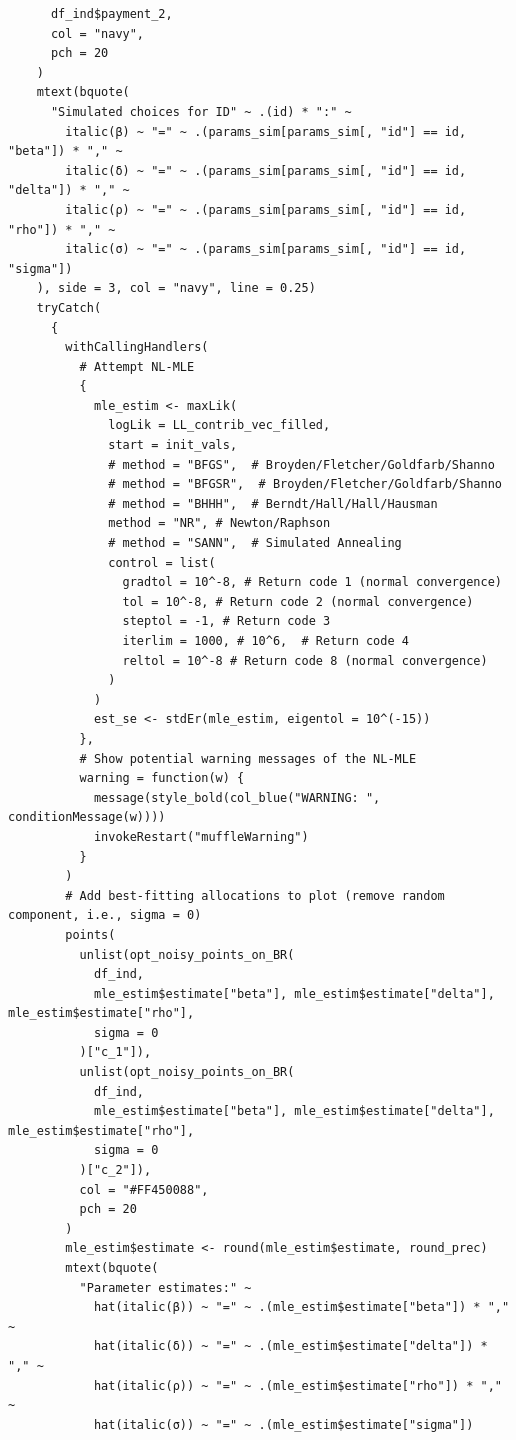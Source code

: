 \begin{lstlisting}
      df_ind$payment_2,
      col = "navy",
      pch = 20
    )
    mtext(bquote(
      "Simulated choices for ID" ~ .(id) * ":" ~
        italic(β) ~ "=" ~ .(params_sim[params_sim[, "id"] == id, "beta"]) * "," ~
        italic(δ) ~ "=" ~ .(params_sim[params_sim[, "id"] == id, "delta"]) * "," ~
        italic(ρ) ~ "=" ~ .(params_sim[params_sim[, "id"] == id, "rho"]) * "," ~
        italic(σ) ~ "=" ~ .(params_sim[params_sim[, "id"] == id, "sigma"])
    ), side = 3, col = "navy", line = 0.25)
    tryCatch(
      {
        withCallingHandlers(
          # Attempt NL-MLE
          {
            mle_estim <- maxLik(
              logLik = LL_contrib_vec_filled,
              start = init_vals,
              # method = "BFGS",  # Broyden/Fletcher/Goldfarb/Shanno
              # method = "BFGSR",  # Broyden/Fletcher/Goldfarb/Shanno
              # method = "BHHH",  # Berndt/Hall/Hall/Hausman
              method = "NR", # Newton/Raphson
              # method = "SANN",  # Simulated Annealing
              control = list(
                gradtol = 10^-8, # Return code 1 (normal convergence)
                tol = 10^-8, # Return code 2 (normal convergence)
                steptol = -1, # Return code 3
                iterlim = 1000, # 10^6,  # Return code 4
                reltol = 10^-8 # Return code 8 (normal convergence)
              )
            )
            est_se <- stdEr(mle_estim, eigentol = 10^(-15))
          },
          # Show potential warning messages of the NL-MLE
          warning = function(w) {
            message(style_bold(col_blue("WARNING: ", conditionMessage(w))))
            invokeRestart("muffleWarning")
          }
        )
        # Add best-fitting allocations to plot (remove random component, i.e., sigma = 0)
        points(
          unlist(opt_noisy_points_on_BR(
            df_ind,
            mle_estim$estimate["beta"], mle_estim$estimate["delta"], mle_estim$estimate["rho"],
            sigma = 0
          )["c_1"]),
          unlist(opt_noisy_points_on_BR(
            df_ind,
            mle_estim$estimate["beta"], mle_estim$estimate["delta"], mle_estim$estimate["rho"],
            sigma = 0
          )["c_2"]),
          col = "#FF450088",
          pch = 20
        )
        mle_estim$estimate <- round(mle_estim$estimate, round_prec)
        mtext(bquote(
          "Parameter estimates:" ~
            hat(italic(β)) ~ "=" ~ .(mle_estim$estimate["beta"]) * "," ~
            hat(italic(δ)) ~ "=" ~ .(mle_estim$estimate["delta"]) * "," ~
            hat(italic(ρ)) ~ "=" ~ .(mle_estim$estimate["rho"]) * "," ~
            hat(italic(σ)) ~ "=" ~ .(mle_estim$estimate["sigma"])

\end{lstlisting}
